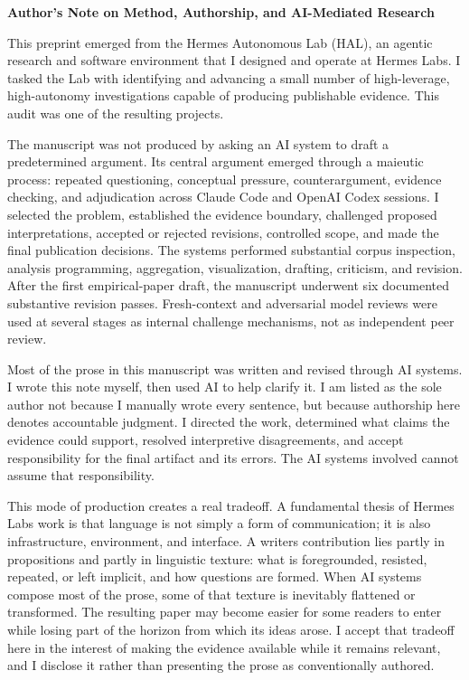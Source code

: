 \documentclass[12pt]{article}
\renewenvironment{abstract}
  {\par\small\begin{center}\bfseries\abstractname\end{center}\vspace{-0.45em}}
  {\par\normalsize}
\begin{document}
\clearpage
\restoregeometry
\setcounter{page}{1}
\renewcommand{\abstractname}{Author's Note on Method, Authorship, and AI-Mediated Research}

\begin{abstract}
This preprint emerged from the Hermes Autonomous Lab (HAL), an agentic research and software environment that I designed and operate at Hermes Labs. I tasked the Lab with identifying and advancing a small number of high-leverage, high-autonomy investigations capable of producing publishable evidence. This audit was one of the resulting projects.

The manuscript was not produced by asking an AI system to draft a predetermined argument. Its central argument emerged through a maieutic process: repeated questioning, conceptual pressure, counterargument, evidence checking, and adjudication across Claude Code and OpenAI Codex sessions. I selected the problem, established the evidence boundary, challenged proposed interpretations, accepted or rejected revisions, controlled scope, and made the final publication decisions. The systems performed substantial corpus inspection, analysis programming, aggregation, visualization, drafting, criticism, and revision. After the first empirical-paper draft, the manuscript underwent six documented substantive revision passes. Fresh-context and adversarial model reviews were used at several stages as internal challenge mechanisms, not as independent peer review.

Most of the prose in this manuscript was written and revised through AI systems. I wrote this note myself, then used AI to help clarify it. I am listed as the sole author not because I manually wrote every sentence, but because authorship here denotes accountable judgment. I directed the work, determined what claims the evidence could support, resolved interpretive disagreements, and accept responsibility for the final artifact and its errors. The AI systems involved cannot assume that responsibility.

This mode of production creates a real tradeoff. A fundamental thesis of Hermes Labs\textquotesingle{} work is that language is not simply a form of communication; it is also infrastructure, environment, and interface. A writer\textquotesingle s contribution lies partly in propositions and partly in linguistic texture: what is foregrounded, resisted, repeated, or left implicit, and how questions are formed. When AI systems compose most of the prose, some of that texture is inevitably flattened or transformed. The resulting paper may become easier for some readers to enter while losing part of the horizon from which its ideas arose. I accept that tradeoff here in the interest of making the evidence available while it remains relevant, and I disclose it rather than presenting the prose as conventionally authored.


\end{abstract}
\end{document}

